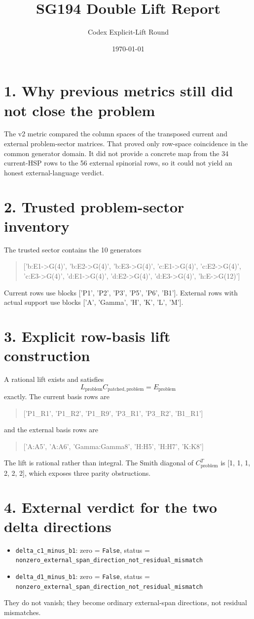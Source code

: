 \documentclass[11pt]{article}
\title{SG194 Double Lift Report}
\author{Codex Explicit-Lift Round}
\date{\today}
\begin{document}
\maketitle

\section*{1. Why previous metrics still did not close the problem}
The v2 metric compared the column spaces of the transposed current and external problem-sector matrices. That proved only row-space coincidence in the common generator domain. It did not provide a concrete map from the 34 current-HSP rows to the 56 external spinorial rows, so it could not yield an honest external-language verdict.

\section*{2. Trusted problem-sector inventory}
The trusted sector contains the 10 generators
\begin{quote}
['b:E1->G(4)', 'b:E2->G(4)', 'b:E3->G(4)', 'c:E1->G(4)', 'c:E2->G(4)', 'c:E3->G(4)', 'd:E1->G(4)', 'd:E2->G(4)', 'd:E3->G(4)', 'h:E->G(12)']
\end{quote}
Current rows use blocks ['P1', 'P2', 'P3', 'P5', 'P6', 'B1']. External rows with actual support use blocks ['A', 'Gamma', 'H', 'K', 'L', 'M'].

\section*{3. Explicit row-basis lift construction}
A rational lift exists and satisfies
\[
L_{\mathrm{problem}} C_{\mathrm{patched,problem}} = E_{\mathrm{problem}}
\]
exactly. The current basis rows are
\begin{quote}
['P1\_R1', 'P1\_R2', 'P1\_R9', 'P3\_R1', 'P3\_R2', 'B1\_R1']
\end{quote}
and the external basis rows are
\begin{quote}
['A:A5', 'A:A6', 'Gamma:Gamma8', 'H:H5', 'H:H7', 'K:K8']
\end{quote}
The lift is rational rather than integral. The Smith diagonal of $C_{\mathrm{problem}}^T$ is [1, 1, 1, 2, 2, 2], which exposes three parity obstructions.

\section*{4. External verdict for the two delta directions}
\begin{itemize}
\item \texttt{delta\_c1\_minus\_b1}: zero = \texttt{False}, status = \texttt{nonzero\_external\_span\_direction\_not\_residual\_mismatch}
\item \texttt{delta\_d1\_minus\_b1}: zero = \texttt{False}, status = \texttt{nonzero\_external\_span\_direction\_not\_residual\_mismatch}
\end{itemize}
They do not vanish; they become ordinary external-span directions, not residual mismatches.
\end{document}
